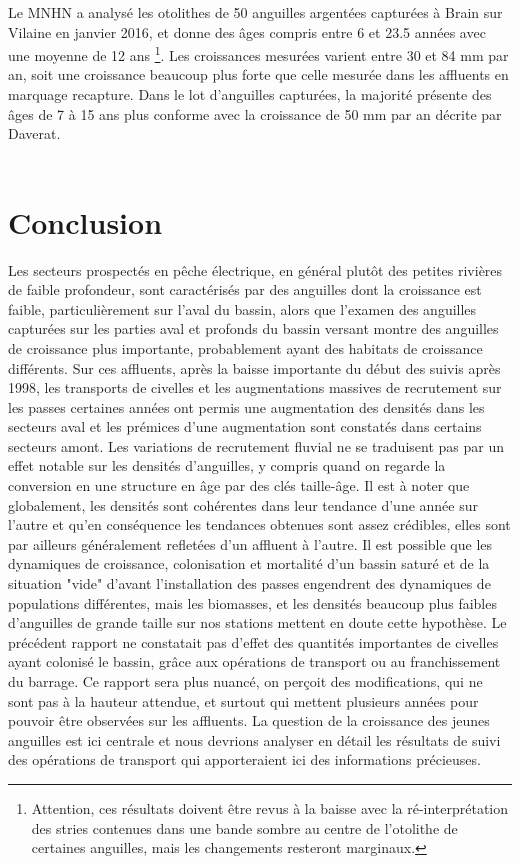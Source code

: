 \documentclass[10pt,twocolumn,titlepage,twoside]{article}\usepackage[]{graphicx}\usepackage[]{xcolor}
\begin{document}
Le MNHN a analysé les otolithes de 50 anguilles argentées capturées à
Brain sur Vilaine en janvier 2016, et donne des âges compris entre 6 et 23.5
années avec une moyenne de 12 ans \footnote{Attention, ces résultats doivent être revus à la baisse avec
la ré-interprétation des stries contenues dans une bande sombre au centre de l'otolithe de certaines anguilles, mais les changements resteront marginaux.}. Les croissances mesurées varient entre 30 et 84
mm par an, soit une croissance beaucoup plus forte que celle mesurée dans les
affluents en marquage recapture. Dans le lot d'anguilles capturées, la majorité
présente des âges de 7 à 15 ans plus conforme avec la croissance de 50 mm par an
décrite par Daverat.\\ 

 \\ \mediumskip

\section[Conclusion]{Conclusion}
Les secteurs prospectés en pêche électrique, en général plutôt des petites
rivières de faible profondeur, sont caractérisés par des anguilles dont la
croissance est faible, particulièrement sur l'aval du bassin, 
alors que l'examen des anguilles capturées sur les parties aval et profonds du bassin
versant montre des anguilles de croissance plus importante, probablement ayant
des habitats de croissance différents. Sur ces affluents, après la baisse
importante du début des suivis après 1998, les transports de civelles et les
augmentations massives de recrutement sur les passes certaines années ont permis
une augmentation des densités dans les secteurs aval et les prémices d'une
augmentation sont constatés dans certains secteurs amont. 
Les variations de recrutement fluvial ne se
traduisent pas par un effet notable sur les densités d'anguilles, y compris
quand on regarde la conversion en une structure en âge par des clés taille-âge.
Il est à noter que globalement, les densités sont cohérentes dans leur tendance d'une année sur 
l'autre et qu'en conséquence les tendances
obtenues sont assez crédibles, elles sont par ailleurs généralement refletées
d'un affluent à l'autre.
Il est possible que les dynamiques de croissance, colonisation et mortalité d'un
bassin saturé et de la situation "vide" d'avant l'installation des passes
engendrent des dynamiques de populations différentes, mais les biomasses, et les
densités beaucoup plus faibles d'anguilles de grande taille sur nos stations
mettent en doute cette hypothèse.
Le précédent rapport ne constatait pas d'effet des quantités importantes de
civelles ayant colonisé le bassin, grâce aux opérations de transport ou au
franchissement du barrage. Ce rapport sera plus nuancé, on perçoit des
modifications, qui ne sont pas à la hauteur attendue, et surtout qui mettent
plusieurs années pour pouvoir être observées sur les affluents. La question de
la croissance des jeunes anguilles est ici centrale et nous devrions analyser
en détail les résultats de suivi des opérations de transport qui apporteraient
ici des informations précieuses. 
\end{document}
